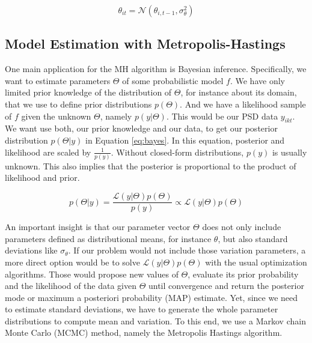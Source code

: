 \documentclass[12pt,english,a4paper,oneside]{article}
\theoremstyle{definition}
\theoremstyle{definition}
\theoremstyle{definition}
\theoremstyle{definition}
\theoremstyle{remark}
\begin{document}
\begin{equation}
\label{eq:dynamics}
\theta_{it} = \mathcal{N}(\theta_{i,t-1}, \sigma_{\theta}^2)
\end{equation}

\hypertarget{model-estimation-with-metropolis-hastings}{%
\subsection{Model Estimation with Metropolis-Hastings}\label{model-estimation-with-metropolis-hastings}}

One main application for the MH algorithm is Bayesian inference. Specifically, we want to estimate parameters \(\Theta\) of some probabilistic model \(f\). We have only limited prior knowledge of the distribution of \(\Theta\), for instance about its domain, that we use to define prior distributions \(p(\Theta)\). And we have a likelihood sample of \(f\) given the unknown \(\Theta\), namely \(p(y|\Theta)\). This would be our PSD data \(y_{ikt}\). We want use both, our prior knowledge and our data, to get our posterior distribution \(p(\Theta|y)\) in Equation \eqref{eq:bayes}. In this equation, posterior and likelihood are scaled by \(\frac{1}{p(y)}\). Without closed-form distributions, \(p(y)\) is usually unknown. This also implies that the posterior is proportional to the product of likelihood and prior.

\begin{equation}
\label{eq:bayes}
p(\Theta|y) = \frac{\mathcal{L}(y|\Theta)p(\Theta)}{p(y)} \propto \mathcal{L}(y|\Theta)p(\Theta)
\end{equation}

\noindent
An important insight is that our parameter vector \(\Theta\) does not only include
parameters defined as distributional means, for instance \(\theta\), but also
standard deviations like \(\sigma_{\theta}\). If our problem would not include those
variation parameters, a more direct option would be to solve \(\mathcal{L}(y|\Theta)p(\Theta)\) with the usual optimization algorithms. Those would
propose new values of \(\Theta\), evaluate its prior probability and the likelihood of
the data given \(\Theta\) until convergence and return the posterior mode or maximum a posteriori probability (MAP) estimate. Yet, since we need to estimate standard deviations,
we have to generate the whole parameter distributions to compute mean and variation. To this end, we use a Markov chain Monte Carlo (MCMC) method, namely the Metropolis Hastings algorithm.
\end{document}

